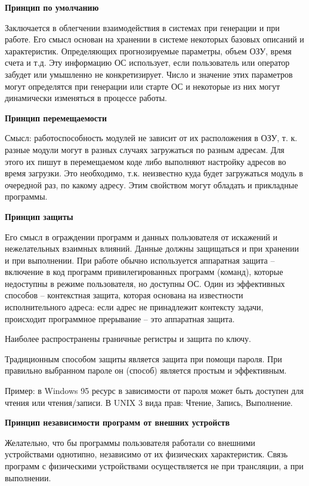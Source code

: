 \textbf{Принцип по умолчанию}

Заключается в облегчении взаимодействия в системах при генерации и при работе. Его смысл основан на хранении в системе некоторых базовых описаний и характеристик. Определяющих прогнозируемые параметры, объем ОЗУ, время счета и т.д. Эту информацию ОС использует, если пользователь или оператор забудет или умышленно не конкретизирует. Число и значение этих параметров могут определятся при генерации или старте ОС и некоторые из них могут динамически изменяться в процессе работы.
\newline

\textbf{Принцип перемещаемости}

Смысл: работоспособность модулей не зависит от их расположения в ОЗУ, т. к. разные модули могут в разных случаях загружаться по разным адресам. Для этого их пишут в перемещаемом коде либо выполняют настройку адресов во время загрузки. Это необходимо, т.к. неизвестно куда будет загружаться модуль в очередной раз, по какому адресу. Этим свойством могут обладать и прикладные программы.
\newline

\textbf{Принцип защиты}

Его смысл в ограждении программ и данных пользователя от искажений и нежелательных взаимных влияний. Данные должны защищаться и при хранении и при выполнении. При работе обычно используется аппаратная защита – включение в код программ привилегированных программ (команд), которые недоступны в режиме пользователя, но доступны ОС.
Один из эффективных способов – контекстная защита, которая основана на известности исполнительного адреса: если адрес не принадлежит контексту задачи, происходит программное прерывание – это аппаратная защита.

Наиболее распространены граничные регистры и защита по ключу.

Традиционным способом защиты является защита при помощи пароля. При правильно выбранном пароле он (способ) является простым и эффективным.

Пример: в Windows 95 ресурс в зависимости от пароля может быть доступен для чтения или чтения/записи. В UNIX 3 вида прав: Чтение, Запись, Выполнение.
\newline

\textbf{Принцип независимости программ от внешних устройств}

Желательно, что бы программы пользователя работали со внешними устройствами однотипно, независимо от их физических характеристик. Связь программ с физическими устройствами осуществляется не при трансляции, а при выполнении.

